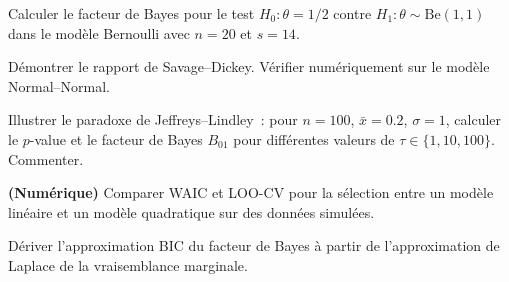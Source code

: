 \begin{exercice}
Calculer le facteur de Bayes pour le test $H_0 : \theta = 1/2$
contre $H_1 : \theta \sim \text{Be}(1,1)$ dans le mod\`ele
Bernoulli avec $n = 20$ et $s = 14$.
\end{exercice}

\begin{exercice}
D\'emontrer le rapport de Savage--Dickey. V\'erifier num\'eriquement
sur le mod\`ele Normal--Normal.
\end{exercice}

\begin{exercice}
Illustrer le paradoxe de Jeffreys--Lindley~: pour $n = 100$,
$\bar{x} = 0.2$, $\sigma = 1$, calculer le $p$-value et le facteur de
Bayes $B_{01}$ pour diff\'erentes valeurs de $\tau \in \{1, 10, 100\}$.
Commenter.
\end{exercice}

\begin{exercice}
\textbf{(Num\'erique)} Comparer WAIC et LOO-CV pour la s\'election
entre un mod\`ele lin\'eaire et un mod\`ele quadratique sur des donn\'ees
simul\'ees.
\end{exercice}

\begin{exercice}
D\'eriver l'approximation BIC du facteur de Bayes \`a partir de
l'approximation de Laplace de la vraisemblance marginale.
\end{exercice}
